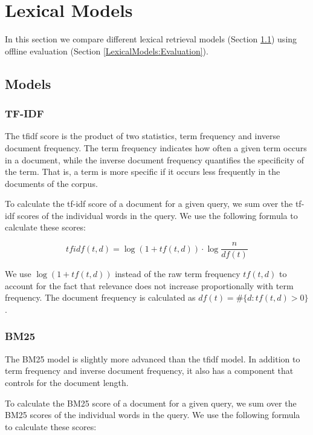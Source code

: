\section{Lexical Models}

In this section we compare different lexical retrieval models
(Section \ref{LexicalModels:Models}) using
offline evaluation (Section \ref{LexicalModels:Evaluation}).

\subsection{Models}
\label{LexicalModels:Models}


\subsubsection{TF-IDF}

The tf\textendash idf score is the product of two statistics, 
term frequency and inverse document frequency.
The term frequency indicates how often a given term occurs in a document,
while the inverse document frequency quantifies the specificity of the term.
That is, a term is more specific if it occurs less frequently in the documents of the corpus.  

To calculate the tf-idf score of a document for a given query, 
we sum over the tf-idf scores of the individual words in the query.
We use the following formula to calculate these scores: 

\begin{equation*}
tfidf(t,d) = \log(1 + tf(t,d)) \cdot \log\frac{n}{df(t)}
\end{equation*}

We use $\log(1 + tf(t,d))$ instead of the raw term frequency $tf(t,d)$
to account for the fact that relevance	does not increase proportionally with term	
frequency. The document frequency is calculated as $df(t) = \#\{d:tf(t,d) > 0\}$.


\subsubsection{BM25}

The BM25 model is slightly more advanced than the tf\textendash idf model.
In addition to term frequency and inverse document frequency,
it also has a component that controls for the document length.

To calculate the BM25 score of a document for a given query, 
we sum over the BM25 scores of the individual words in the query.
We use the following formula to calculate these scores: 

